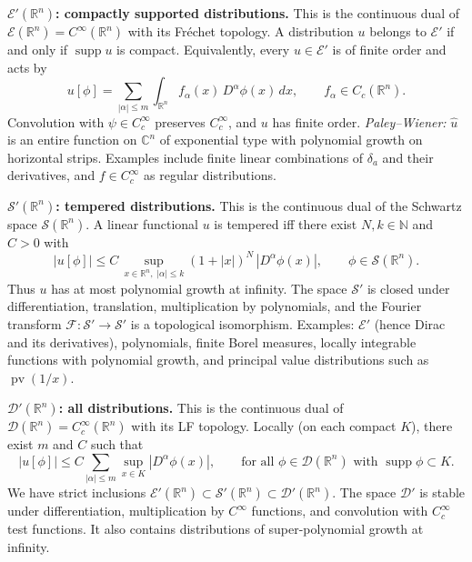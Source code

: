\begin{problem}[CP-III-0024]
\par\smallskip\noindent\textbf{$\mathcal E'(\mathbb R^n)$: compactly supported distributions.}\quad
This is the continuous dual of $\mathcal E(\mathbb R^n)=C^\infty(\mathbb R^n)$ with its Fr\'echet topology.
A distribution $u$ belongs to $\mathcal E'$ if and only if $\operatorname{supp}u$ is compact.
Equivalently, every $u\in\mathcal E'$ is of finite order and acts by
\[
u[\phi]=\sum_{|\alpha|\le m}\int_{\mathbb R^n} f_\alpha(x)\,D^\alpha\phi(x)\,dx,
\qquad f_\alpha\in C_c(\mathbb R^n).
\]
Convolution with $\psi\in C_c^\infty$ preserves $C_c^\infty$, and $u$ has finite order.
\emph{Paley--Wiener:} $\widehat{u}$ is an entire function on $\mathbb C^n$ of exponential type with polynomial growth on horizontal strips.
Examples include finite linear combinations of $\delta_a$ and their derivatives, and $f\in C_c^\infty$ as regular distributions.

\bigskip

\par\smallskip\noindent\textbf{$\mathcal S'(\mathbb R^n)$: tempered distributions.}\quad
This is the continuous dual of the Schwartz space $\mathcal S(\mathbb R^n)$.
A linear functional $u$ is tempered iff there exist $N,k\in\mathbb N$ and $C>0$ with
\[
|u[\phi]|\le C\,\sup_{x\in\mathbb R^n,\;|\alpha|\le k}(1+|x|)^N\,|D^\alpha\phi(x)|,
\qquad \phi\in\mathcal S(\mathbb R^n).
\]
Thus $u$ has at most polynomial growth at infinity. The space $\mathcal S'$ is closed under differentiation, translation,
multiplication by polynomials, and the Fourier transform $\mathcal F:\mathcal S'\to\mathcal S'$ is a topological isomorphism.
Examples: $\mathcal E'$ (hence Dirac and its derivatives), polynomials, finite Borel measures,
locally integrable functions with polynomial growth, and principal value distributions such as $\operatorname{pv}(1/x)$.

\bigskip

\par\smallskip\noindent\textbf{$\mathcal D'(\mathbb R^n)$: all distributions.}\quad
This is the continuous dual of $\mathcal D(\mathbb R^n)=C_c^\infty(\mathbb R^n)$ with its LF topology.
Locally (on each compact $K$), there exist $m$ and $C$ such that
\[
|u[\phi]|\le C\sum_{|\alpha|\le m}\sup_{x\in K}|D^\alpha\phi(x)|,
\qquad \text{for all }\phi\in\mathcal D(\mathbb R^n)\text{ with }\operatorname{supp}\phi\subset K.
\]
We have strict inclusions $\mathcal E'(\mathbb R^n)\subset \mathcal S'(\mathbb R^n)\subset \mathcal D'(\mathbb R^n)$.
The space $\mathcal D'$ is stable under differentiation, multiplication by $C^\infty$ functions,
and convolution with $C_c^\infty$ test functions.
It also contains distributions of super-polynomial growth at infinity.


\end{problem}
